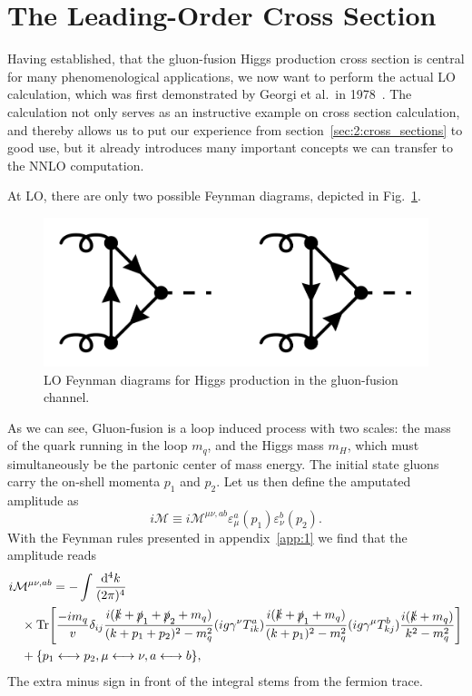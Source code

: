 \section{The Leading-Order Cross Section} \label{sec:4:LO_xSec}
Having established, that the gluon-fusion Higgs production cross section is central for many phenomenological applications, we now want to perform the actual \acs{LO} calculation, which was first demonstrated by Georgi et al.\ in 1978~\cite{Georgi:1977gs}. The calculation not only serves as an instructive example on cross section calculation, and thereby allows us to put our experience from section~\ref{sec:2:cross_sections} to good use, but it already introduces many important concepts we can transfer to the \acs{NNLO} computation.

At LO, there are only two possible Feynman diagrams, depicted in Fig.~\ref{fig:4:LO}.
\begin{figure}[h]
\centering
\includegraphics[scale=0.2]{Images/LO.pdf}
\caption{\acs{LO} Feynman diagrams for Higgs production in the gluon-fusion channel.}
\label{fig:4:LO}
\end{figure}
As we can see, Gluon-fusion is a loop induced process with two scales: the mass of the quark running in the loop $m_q$, and the Higgs mass $m_H$, which must simultaneously be the partonic center of mass energy. The initial state gluons carry the on-shell momenta $p_1$ and $p_2$. Let us then define the amputated amplitude as
\begin{equation}
i\mathcal{M} \equiv i \mathcal{M}^{\mu\nu, ab} \varepsilon_\mu^a(p_1) \varepsilon_\nu^b(p_2).
\end{equation}
With the Feynman rules presented in appendix~\ref{app:1} we find that the amplitude reads
\begin{equation}
\begin{split}
&i \mathcal{M}^{\mu \nu, ab} = -\int \frac{\mathrm{d}^4 k}{(2\pi)^4}\, \\
&\quad \times \text{Tr}\!\left[ \frac{-i m_q}{v} \delta_{ij} \frac{i(\slashed{k} + \slashed{p}_1 + \slashed{p}_2 + m_q)}{(k + p_1 + p_2)^2 - m_q^2} (ig \gamma^\nu T^a_{ik}) \frac{i (\slashed{k} + \slashed{p}_1 + m_q)}{(k + p_1)^2 - m_q^2} (i g \gamma^\mu T^b_{kj}) \frac{i (\slashed{k} + m_q)}{k^2 - m_q^2} \right] \\
&\quad + \lbrace p_1 \longleftrightarrow p_2,  \mu \longleftrightarrow \nu, a \longleftrightarrow b \rbrace ,
\label{eq:4:form_factor_amplitude}
\end{split}
\end{equation}
The extra minus sign in front of the integral stems from the fermion trace.

